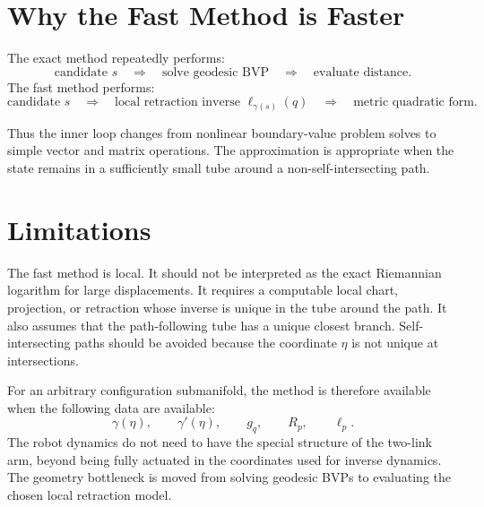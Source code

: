 \documentclass[11pt]{article}
\begin{document}
\section{Why the Fast Method is Faster}

The exact method repeatedly performs:
\[
    \text{candidate }s
    \quad\Rightarrow\quad
    \text{solve geodesic BVP}
    \quad\Rightarrow\quad
    \text{evaluate distance}.
\]
The fast method performs:
\[
    \text{candidate }s
    \quad\Rightarrow\quad
    \text{local retraction inverse } \ell_{\gamma(s)}(q)
    \quad\Rightarrow\quad
    \text{metric quadratic form}.
\]

Thus the inner loop changes from nonlinear boundary-value problem solves to
simple vector and matrix operations. The approximation is appropriate when the
state remains in a sufficiently small tube around a non-self-intersecting path.

\section{Limitations}

The fast method is local. It should not be interpreted as the exact Riemannian
logarithm for large displacements. It requires a computable local chart,
projection, or retraction whose inverse is unique in the tube around the path.
It also assumes that the path-following tube has a unique closest branch.
Self-intersecting paths should be avoided because the coordinate \(\eta\) is
not unique at intersections.

For an arbitrary configuration submanifold, the method is therefore available
when the following data are available:
\[
    \gamma(\eta),\qquad
    \gamma'(\eta),\qquad
    g_q,\qquad
    R_p,\qquad
    \ell_p.
\]
The robot dynamics do not need to have the special structure of the two-link
arm, beyond being fully actuated in the coordinates used for inverse dynamics.
The geometry bottleneck is moved from solving geodesic BVPs to evaluating the
chosen local retraction model.
\end{document}
